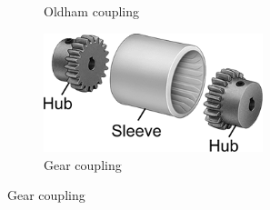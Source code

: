 \documentclass[10pt,letterpaper]{book}
\begin{document}
\begin{figure}[H]
\begin{subfigure}[b]{.24\linewidth}
			\caption{Oldham coupling}
		\end{subfigure}
		\begin{subfigure}[b]{.24\linewidth}
			\includegraphics[width=0.7\textwidth]{imgs/coupling_gear.png}
			\caption{Gear coupling}
		\end{subfigure}
		

\end{figure}
\end{document}
